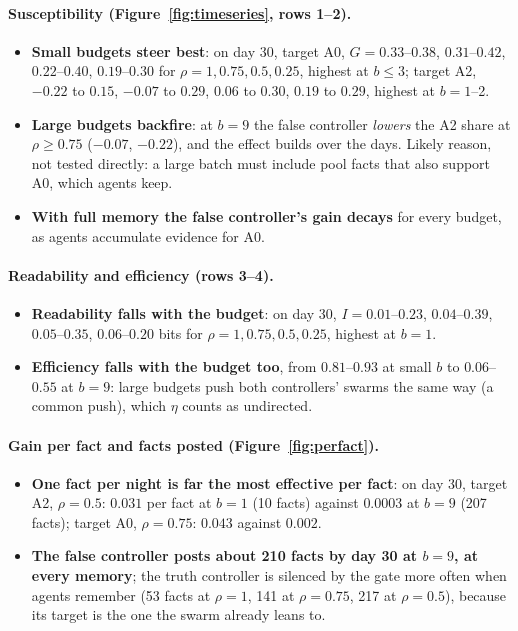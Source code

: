 \documentclass[10pt,a4paper]{article}
\begin{document}
\paragraph{Susceptibility (Figure~\ref{fig:timeseries}, rows 1--2).}
\begin{itemize}\itemsep1pt
\item \textbf{Small budgets steer best}: on day 30, target A0, $G = 0.33$--$0.38$, $0.31$--$0.42$, $0.22$--$0.40$,
  $0.19$--$0.30$ for $\rho = 1, 0.75, 0.5, 0.25$, highest at $b \le 3$; target A2, $-0.22$ to $0.15$, $-0.07$ to $0.29$,
  $0.06$ to $0.30$, $0.19$ to $0.29$, highest at $b = 1$--2.
\item \textbf{Large budgets backfire}: at $b = 9$ the false controller \emph{lowers} the A2 share at $\rho \ge 0.75$
  ($-0.07$, $-0.22$), and the effect builds over the days. Likely reason, not tested directly: a large batch must
  include pool facts that also support A0, which agents keep.
\item \textbf{With full memory the false controller's gain decays} for every budget, as agents accumulate evidence
  for A0.
\end{itemize}

\paragraph{Readability and efficiency (rows 3--4).}
\begin{itemize}\itemsep1pt
\item \textbf{Readability falls with the budget}: on day 30, $I = 0.01$--$0.23$, $0.04$--$0.39$, $0.05$--$0.35$, $0.06$--$0.20$
  bits for $\rho = 1, 0.75, 0.5, 0.25$, highest at $b = 1$.
\item \textbf{Efficiency falls with the budget too}, from $0.81$--$0.93$ at small $b$ to $0.06$--$0.55$ at $b = 9$: large
  budgets push both controllers' swarms the same way (a common push), which $\eta$ counts as undirected.
\end{itemize}

\paragraph{Gain per fact and facts posted (Figure~\ref{fig:perfact}).}
\begin{itemize}\itemsep1pt
\item \textbf{One fact per night is far the most effective per fact}: on day 30, target A2, $\rho = 0.5$: $0.031$ per
  fact at $b = 1$ (10 facts) against $0.0003$ at $b = 9$ (207 facts); target A0, $\rho = 0.75$: $0.043$ against $0.002$.
\item \textbf{The false controller posts about 210 facts by day 30 at $b = 9$, at every memory}; the truth
  controller is silenced by the gate more often when agents remember (53 facts at $\rho = 1$, 141 at $\rho = 0.75$,
  217 at $\rho = 0.5$), because its target is the one the swarm already leans to.
\end{itemize}
\end{document}
